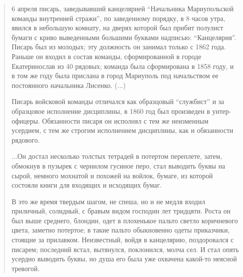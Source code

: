  
 
 
 
 

\begin{quote}
\small
	
6 апреля писарь, заведывавший канцелярией \enquote{Начальника Мариупольской команды
внутренней стражи}, по заведенному порядку, в 8 часов утра, явился в небольшую
комнату, на дверях которой был прибит полулист бумаги с криво выведенными
большими буквами надписью: \enquote{Канцелярия}. Писарь был из молодых; эту должность
он занимал только с 1862 года. Раньше он входил в состав команды,
сформированной в городе Екатеринослав из 40 рядовых; команда была сформирована
в 1858 году, и в том же году была прислана в город Мариуполь под начальством ее
постоянного начальника Лисенко. (...)

Писарь войсковой команды отличался как образцовый \enquote{службист} и за образцовое
исполнение дисциплины, в 1860 год был произведен в унтер-офицеры. Обязанности
писаря он исполнял с тем же неизменным усердием, с тем же строгим исполнением
дисциплины, как и обязанности рядового.

...Он достал несколько толстых тетрадей в потертом переплете, затем, обмокнув в
пузырек с чернилом гусиное перо, стал выводить буквы на сырой, немного мохнатой
и похожей на войлок, бумаге, из которой состояли книги для входящих и исходящих
бумаг.


В это же время твердым шагом, не спеша, но и не медля входил приличный,
солидный, с бравым видом господин лет тридцяти. Роста он был выше среднего,
блондин, одет в плохенькое пальто светло коричневого цвета, заметно потертое; в
такие пальто обыкновенно одеты приказчики, стоящие за прилавком. Неизвестный,
войдя в канцелярию, поздоровался с писарем; последний встал, вытянулся,
поклонился, молча сел. И стал опять усердно выводить буквы, но душа его была
уже охвачена какой-то неясной тревогой.


\end{quote}
